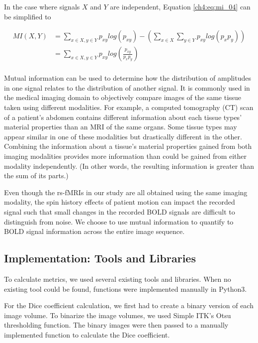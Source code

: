 \noindent In the case where signals $X$ and $Y$ are independent, Equation \ref{ch4:eq:mi_04} can be simplified to

\begin{equation}
\label{ch4:eq:mi_05}
\begin{split}
MI(X, Y) & = \sum_{x \in X, y \in Y} p_{xy} log (p_{xy}) - \left( \sum_{x \in X} \sum_{y \in Y} p_{xy} log(p_x p_y) \right) \\
 & = \sum_{x \in X, y \in Y} p_{xy} log \left( \frac{p_{xy}}{p_x p_y} \right) \\
\end{split}
\end{equation} 

Mutual information can be used to determine how the distribution of amplitudes in one signal relates to the distribution of another signal. It is commonly used in the medical imaging domain to objectively compare images of the same tissue taken using different modalities. For example, a computed tomography (CT) scan of a patient's abdomen contains different information about each tissue types' material properties than an MRI of the same organs. Some tissue types may appear similar in one of these modalities but drastically different in the other. Combining the information about a tissue's material properties gained from both imaging modalities provides more information than could be gained from either modality independently. (In other words, the resulting information is greater than the sum of its parts.)

Even though the rs-fMRIs in our study are all obtained using the same imaging modality, the spin history effects of patient motion can impact the recorded signal such that small changes in the recorded BOLD signals are difficult to distinguish from noise. We choose to use mutual information to quantify to BOLD signal information across the entire image sequence.

\subsection{Implementation: Tools and Libraries}

To calculate metrics, we used several existing tools and libraries. When no existing tool could be found, functions were implemented manually in Python3. 

For the Dice coefficient calculation, we first had to create a binary version of each image volume. To binarize the image volumes, we used Simple ITK's Otsu thresholding function. The binary images were then passed to a manually implemented function to calculate the Dice coefficient.

